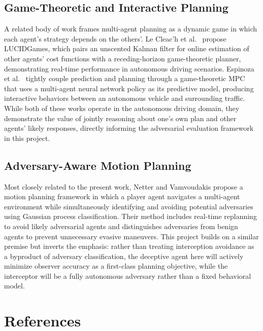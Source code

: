 \documentclass[letterpaper, 10pt, conference]{ieeeconf}
\begin{document}
\subsection{Game-Theoretic and Interactive Planning} \label{sec:related-work/game-theoretic-and-interactive-planning}

A related body of work frames multi-agent planning as a dynamic game in which each agent's strategy depends on the others'. Le Cleac'h et al.\ \cite{lecleach2021lucidgames} propose LUCIDGames, which pairs an unscented Kalman filter for online estimation of other agents' cost functions with a receding-horizon game-theoretic planner, demonstrating real-time performance in autonomous driving scenarios. Espinoza et al.\ \cite{espinoza2022deep} tightly couple prediction and planning through a game-theoretic MPC that uses a multi-agent neural network policy as its predictive model, producing interactive behaviors between an autonomous vehicle and surrounding traffic. While both of these works operate in the autonomous driving domain, they demonstrate the value of jointly reasoning about one's own plan and other agents' likely responses, directly informing the adversarial evaluation framework in this project.

\subsection{Adversary-Aware Motion Planning} \label{sec:related-work/adversary-aware-motion-planning}

Most closely related to the present work, Netter and Vamvoudakis \cite{netter2024motion} propose a motion planning framework in which a player agent navigates a multi-agent environment while simultaneously identifying and avoiding potential adversaries using Gaussian process classification. Their method includes real-time replanning to avoid likely adversarial agents and distinguishes adversaries from benign agents to prevent unnecessary evasive maneuvers. This project builds on a similar premise but inverts the emphasis: rather than treating interception avoidance as a byproduct of adversary classification, the deceptive agent here will actively minimize observer accuracy as a first-class planning objective, while the interceptor will be a fully autonomous adversary rather than a fixed behavioral model.

\section*{References} \label{sec:references}
\printbibliography[heading = none]
\end{document}
